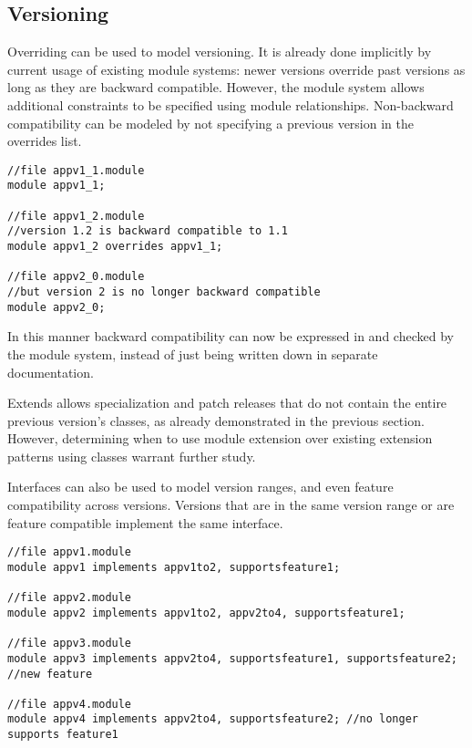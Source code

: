 \subsection{Versioning}

Overriding can be used to model versioning. It is already done
implicitly by current usage of existing module systems: newer versions  
override past versions as long as they are backward compatible.
However, the module system allows additional constraints to be specified using
module relationships. Non-backward compatibility can be modeled by not specifying a
previous version in the overrides list.

\begin{lstlisting}[caption=Versioning Using Overrides]
//file appv1_1.module
module appv1_1;

//file appv1_2.module
//version 1.2 is backward compatible to 1.1
module appv1_2 overrides appv1_1;

//file appv2_0.module
//but version 2 is no longer backward compatible
module appv2_0; 
\end{lstlisting}

In this manner backward compatibility can now be expressed in 
and checked by the module system, instead of just being written
down in separate documentation.

Extends allows specialization and patch releases that do not contain 
the entire previous version's classes, as already demonstrated in
the previous section. However, determining when to use module
extension over existing extension patterns using classes warrant
further study.

Interfaces can also be used to model version ranges, and even feature
compatibility across versions. Versions that are in the same version 
range or are feature compatible implement the same interface.

\begin{lstlisting}[caption=Interfaces as Properties]
//file appv1.module
module appv1 implements appv1to2, supportsfeature1;

//file appv2.module
module appv2 implements appv1to2, appv2to4, supportsfeature1;

//file appv3.module
module appv3 implements appv2to4, supportsfeature1, supportsfeature2; //new feature

//file appv4.module
module appv4 implements appv2to4, supportsfeature2; //no longer supports feature1
\end{lstlisting}

